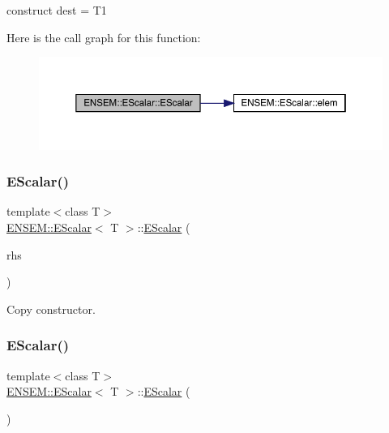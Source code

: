 construct dest = T1 

Here is the call graph for this function\+:
\nopagebreak
\begin{figure}[H]
\begin{center}
\leavevmode
\includegraphics[width=350pt]{d0/d82/classENSEM_1_1EScalar_a1436a0e5b8bf00083caf1540f4fc9397_cgraph}
\end{center}
\end{figure}
\mbox{\label{classENSEM_1_1EScalar_a002ac4bc9bc6e5ad476613e4edaa827a}} 
\subsubsection{\texorpdfstring{EScalar()}{EScalar()}\hspace{0.1cm}{\footnotesize\ttfamily [6/12]}}
{\footnotesize\ttfamily template$<$class T$>$ \\
\mbox{\hyperlink{classENSEM_1_1EScalar}{E\+N\+S\+E\+M\+::\+E\+Scalar}}$<$ T $>$\+::\mbox{\hyperlink{classENSEM_1_1EScalar}{E\+Scalar}} (\begin{DoxyParamCaption}\item[{const \mbox{\hyperlink{classENSEM_1_1EScalar}{E\+Scalar}}$<$ T $>$ \&}]{rhs }\end{DoxyParamCaption})\hspace{0.3cm}{\ttfamily [inline]}}



Copy constructor. 

\mbox{\label{classENSEM_1_1EScalar_ad4290141b2f7d43b6652d8ef95dfdbf5}} 
\subsubsection{\texorpdfstring{EScalar()}{EScalar()}\hspace{0.1cm}{\footnotesize\ttfamily [7/12]}}
{\footnotesize\ttfamily template$<$class T$>$ \\
\mbox{\hyperlink{classENSEM_1_1EScalar}{E\+N\+S\+E\+M\+::\+E\+Scalar}}$<$ T $>$\+::\mbox{\hyperlink{classENSEM_1_1EScalar}{E\+Scalar}} (\begin{DoxyParamCaption}{ }\end{DoxyParamCaption})\hspace{0.3cm}{\ttfamily [inline]}}

